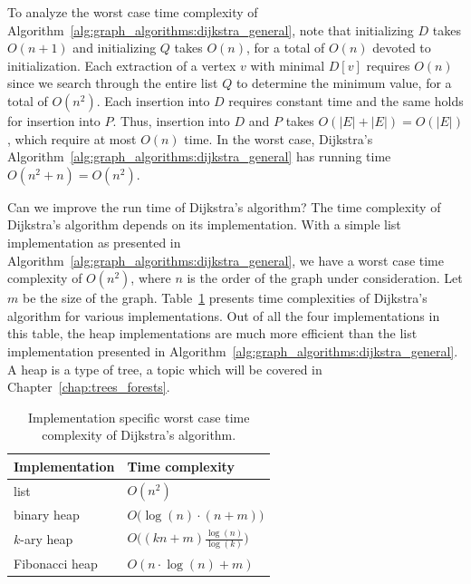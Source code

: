 To analyze the worst case time complexity of
Algorithm~\ref{alg:graph_algorithms:dijkstra_general}, note that
initializing $D$ takes $O(n + 1)$ and initializing $Q$ takes $O(n)$,
for a total of $O(n)$ devoted to initialization. Each extraction of a
vertex $v$ with minimal $D[v]$ requires $O(n)$ since we search through
the entire list $Q$ to determine the minimum value, for a total of
$O(n^2)$. Each insertion into $D$ requires constant time and the same
holds for insertion into $P$. Thus, insertion into $D$ and $P$ takes
$O(|E| + |E|) = O(|E|)$, which require at most $O(n)$ time. In the
worst case, Dijkstra's
Algorithm~\ref{alg:graph_algorithms:dijkstra_general} has running time
$O(n^2 + n) = O(n^2)$.

Can we improve the run time of Dijkstra's algorithm? The time
complexity of Dijkstra's algorithm depends on its implementation. With
a simple list implementation as presented in
Algorithm~\ref{alg:graph_algorithms:dijkstra_general}, we have a worst
case time complexity of $O(n^2)$, where $n$ is the order of the graph
under consideration. Let $m$ be the size of the
graph. Table~\ref{tab:graph_algorithms:worst_case_time_complexity_Dijkstra}
presents time complexities of Dijkstra's algorithm for various
implementations. Out of all the four implementations in this table,
the heap implementations are much more efficient than the list
implementation presented in
Algorithm~\ref{alg:graph_algorithms:dijkstra_general}. A heap is a type
of tree, a topic which will be covered in
Chapter~\ref{chap:trees_forests}.

\begin{table}[!htbp]
\centering
\begin{tabular}{|ll|} \hline
Implementation & Time complexity \\\hline\hline
list           & $O(n^2)$ \\
binary heap    & $O \big( \log(n) \cdot (n + m) \big)$ \\
$k$-ary heap   & $O \big( (kn + m) \frac{\log(n)}{\log(k)} \big)$ \\
Fibonacci heap & $O(n \cdot \log(n) + m)$ \\\hline
\end{tabular}
\caption{Implementation specific worst case time complexity of
  Dijkstra's algorithm.}
\label{tab:graph_algorithms:worst_case_time_complexity_Dijkstra}
\end{table}



